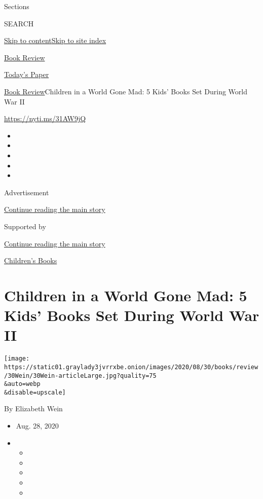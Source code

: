 Sections

SEARCH

\protect\hyperlink{site-content}{Skip to
content}\protect\hyperlink{site-index}{Skip to site index}

\href{https://www.nytimes3xbfgragh.onion/section/books/review}{Book
Review}

\href{https://myaccount.nytimes3xbfgragh.onion/auth/login?response_type=cookie\&client_id=vi}{}

\href{https://www.nytimes3xbfgragh.onion/section/todayspaper}{Today's
Paper}

\href{/section/books/review}{Book Review}\textbar{}Children in a World
Gone Mad: 5 Kids' Books Set During World War II

\url{https://nyti.ms/31AW9jQ}

\begin{itemize}
\item
\item
\item
\item
\item
\end{itemize}

Advertisement

\protect\hyperlink{after-top}{Continue reading the main story}

Supported by

\protect\hyperlink{after-sponsor}{Continue reading the main story}

\href{/column/childrens-books}{Children's Books}

\hypertarget{children-in-a-world-gone-mad-5-kids-books-set-during-world-war-ii}{%
\section{Children in a World Gone Mad: 5 Kids' Books Set During World
War
II}\label{children-in-a-world-gone-mad-5-kids-books-set-during-world-war-ii}}

\texttt{[image: https://static01.graylady3jvrrxbe.onion/images/2020/08/30/books/review/30Wein/30Wein-articleLarge.jpg?quality=75\\\&auto=webp\\\&disable=upscale]}

By Elizabeth Wein

\begin{itemize}
\item
  Aug. 28, 2020
\item
  \begin{itemize}
  \item
  \item
  \item
  \item
  \item
  \end{itemize}
\end{itemize}

